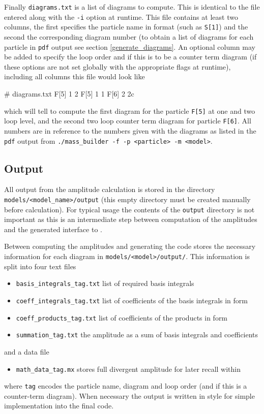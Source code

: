 Finally \lstinline{diagrams.txt} is a list of diagrams to compute.  This is identical to the file entered along with the \lstinline{-i} option at runtime.  This file contains at least two columns, the first specifies the particle name in \feynarts format (such as \lstinline{S[1]}) and the second the corresponding diagram number (to obtain a list of diagrams for each particle in \lstinline{pdf} output see section \ref{generate_diagrams}.  An optional column may be added to specify the loop order and if this is to be a counter term diagram (if these options are not set globally with the appropriate flags at runtime), including all columns this file would look like
\begin{lstterm}
# diagrams.txt
F[5]   1   2
F[5]   1   1
F[6]   2   2c
\end{lstterm}
which will tell \mb to compute the first diagram for the particle \lstinline{F[5]} at one and two loop level, and the second two loop counter term diagram for particle \lstinline{F[6]}.  All numbers are in reference to the numbers given with the diagrams as listed in the \lstinline{pdf} output from \lstinline{./mass_builder -f -p <particle> -m <model>}.

\subsection{Output}

All output from the amplitude calculation is stored in the directory \lstinline{models/<model_name>/output} (this empty directory must be created manually before calculation).  For typical usage the contents of the \lstinline{output} directory is not important as this is an intermediate step between computation of the amplitudes and the generated \CC interface to \tsils.

Between computing the amplitudes and generating the code \mb stores the necessary information for each diagram in \lstinline{models/<model>/output/}.  This information is split into four text files
\begin{itemize}
\item \lstinline{basis_integrals_tag.txt} list of required basis integrals
\item \lstinline{coeff_integrals_tag.txt} list of coefficients of the basis integrals in \CC form
\item \lstinline{coeff_products_tag.txt} list of coefficients of the products in \CC form
\item \lstinline{summation_tag.txt} the amplitude as a sum of basis integrals and coefficients
\end{itemize}
and a \mathematica data file
\begin{itemize}
\item \lstinline{math_data_tag.mx} stores full divergent amplitude for later recall within \mathematica
\end{itemize}
where \lstinline{tag} encodes the particle name, diagram and loop order (and if this is a counter-term diagram).  When necessary the output is written in \CC style for simple implementation into the final code.

